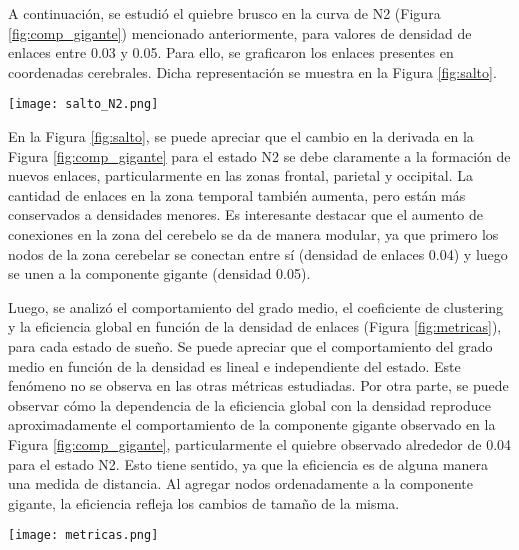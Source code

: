 \documentclass[a4paper,10pt,twocolumn,spanish]{article}
\begin{document}
A continuación, se estudió el quiebre brusco en la curva de N2 (Figura \ref{fig:comp_gigante}) mencionado anteriormente, para valores de densidad de enlaces entre 0.03 y 0.05. Para ello, se graficaron los enlaces presentes en coordenadas cerebrales. Dicha representación se muestra en la Figura \ref{fig:salto}.

\begin{figure*}[htb]
\centering
\texttt{[image: salto\_N2.png]}
\caption{Enlaces entre nodos presentes a distintas densidades - Coordenadas cerebrales}
\label{fig:salto}
\end{figure*}

En la Figura \ref{fig:salto}, se puede apreciar que el cambio en la derivada en la Figura \ref{fig:comp_gigante} para el estado N2 se debe claramente a la formación de nuevos enlaces, particularmente en las zonas frontal, parietal y occipital. La cantidad de enlaces en la zona temporal también aumenta, pero están más conservados a densidades menores. Es interesante destacar que el aumento de conexiones en la zona del cerebelo se da de manera modular, ya que primero los nodos de la zona cerebelar se conectan entre sí (densidad de enlaces 0.04) y luego se unen a la componente gigante (densidad 0.05).

Luego, se analizó el comportamiento del grado medio, el coeficiente de clustering y la eficiencia global en función de la densidad de enlaces (Figura \ref{fig:metricas}), para cada estado de sueño. Se puede apreciar que el comportamiento del grado medio en función de la densidad es lineal e independiente del estado. Este fenómeno no se observa en las otras métricas estudiadas. Por otra parte, se puede observar cómo la dependencia de la eficiencia global con la densidad reproduce aproximadamente el comportamiento de la componente gigante observado en la Figura \ref{fig:comp_gigante}, particularmente el quiebre observado alrededor de 0.04 para el estado N2. Esto tiene sentido, ya que la eficiencia es de alguna manera una medida de distancia. Al agregar nodos ordenadamente a la componente gigante, la eficiencia refleja los cambios de tamaño de la misma. 

\begin{figure*}[htb]
\centering
\texttt{[image: metricas.png]}
\caption{Caracterización del grafo - Dependencia con densidad de enlaces}
\label{fig:metricas}
\end{figure*}
\end{document}
